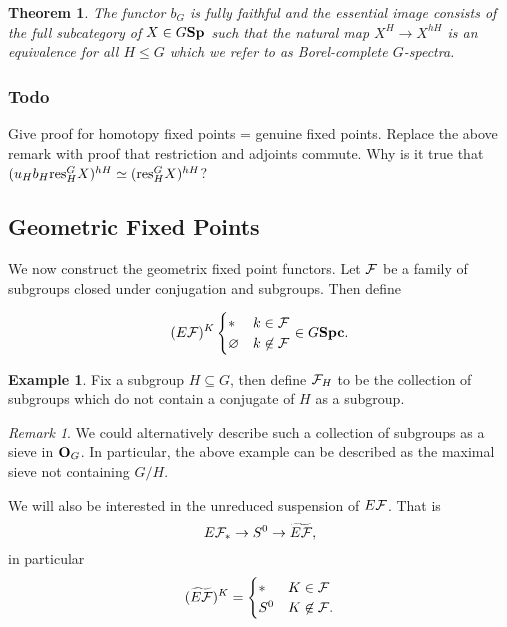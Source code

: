 \documentclass[letterpaper]{article}
\theoremstyle{definition}
\newtheorem{ex}{Example}
\theoremstyle{remark}
\newtheorem{remark}{Remark}
\theoremstyle{plain}
\newtheorem{theorem}{Theorem}
\begin{document}
\begin{theorem}
		The functor $b_G$ is fully faithful and the essential image consists of the full subcategory of $X\in G\mathbf{Sp}$ such that the natural map $X^H\rightarrow X^{hH}$ is an equivalence for all $H\leq G$ which we refer to as Borel-complete $G$-spectra.
\end{theorem}

\subsubsection*{Todo}

\begin{outline}
\1 Give proof for homotopy fixed points = genuine fixed points.
\1 Replace the above remark with proof that restriction and adjoints commute.
\1 Why is it true that $(u_H b_H\textnormal{res}^G_H X)^{hH}\simeq(\textnormal{res}^G_H X)^{hH}$?
\end{outline}


\subsection{Geometric Fixed Points}

We now construct the geometrix fixed point functors. Let $\mathcal{F}$ be a family of subgroups closed under conjugation and subgroups. Then define

\[
(E\mathcal{F})^K
\begin{cases}
		* & k\in\mathcal{F}\\
		\varnothing & k\not\in\mathcal{F}
\end{cases}
\in G\mathbf{Spc}.
\]

\begin{ex}
		Fix a subgroup $H\subseteq G$, then define $\mathcal{F}_H$ to be the collection of subgroups which do not contain a conjugate of $H$ as a subgroup.
\end{ex}

\begin{remark}
		We could alternatively describe such a collection of subgroups as a sieve in $\mathbf{O}_G$. In particular, the above example can be described as the maximal sieve not containing $G/H$.
\end{remark}

We will also be interested in the unreduced suspension of $E\mathcal{F}$. That is
$$E\mathcal{F}_*\rightarrow S^0\rightarrow \widetilde{E\mathcal{F}},$$
in particular
\[
(\widetilde{E\mathcal{F}})^K =
\begin{cases}
		*	&	K\in\mathcal{F}\\
		S^0	&	K\not\in\mathcal{F}.
\end{cases}
\]
\end{document}
